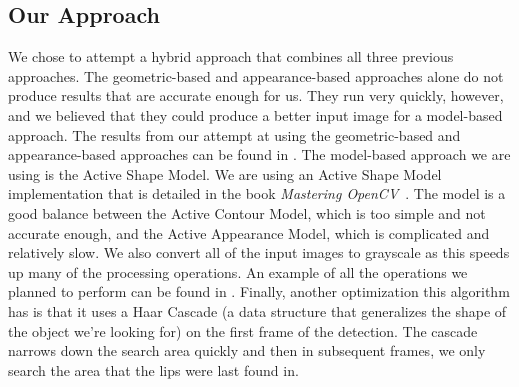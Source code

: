 \subsection{Our Approach}

We chose to attempt a hybrid approach that combines all three previous approaches. The geometric-based and appearance-based approaches alone do not produce results that are accurate enough for us. They run very quickly, however, and we believed that they could produce a better input image for a model-based approach. The results from our attempt at using the geometric-based and appearance-based approaches can be found in . The model-based approach we are using is the Active Shape Model. We are using an Active Shape Model implementation that is detailed in the book \textit{Mastering OpenCV}~\cite{mastering-opencv}.
The model is a good balance between the Active Contour Model, which is too simple and not accurate enough, and the Active Appearance Model, which is complicated and relatively slow. We also convert all of the input images to grayscale as this speeds up many of the processing operations. An example of all the operations we planned to perform can be found in . 
Finally, another optimization this algorithm has is that it uses a Haar Cascade (a data structure that generalizes the shape of the object we're looking for) on the first frame of the detection. The cascade narrows down the search area quickly and then in subsequent frames, we only search the area that the lips were last found in.

